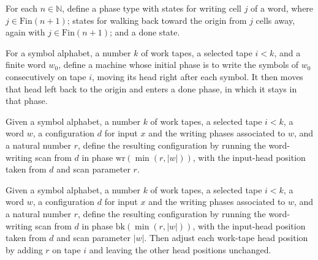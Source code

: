 \begin{definition}
\label{Turing.WritePhase}
\leanok
For each $n\in\mathbb N$, define a phase type with states for writing cell $j$ of a
word, where $j\in\mathrm{Fin}(n+1)$; states for walking back toward the origin from $j$
cells away, again with $j\in\mathrm{Fin}(n+1)$; and a done state.
\end{definition}

\begin{definition}
\label{Turing.writeConstTM}
\leanok
{}
For a symbol alphabet, a number $k$ of work tapes, a selected tape $i<k$, and a finite
word $w_0$, define a machine whose initial phase is to write the symbols of $w_0$
consecutively on tape $i$, moving its head right after each symbol. It then moves that
head left back to the origin and enters a done phase, in which it stays in that phase.
\end{definition}

\begin{definition}
\label{Turing.scanConstF}
\leanok
{}
Given a symbol alphabet, a number $k$ of work tapes, a selected tape $i<k$, a word $w$,
a configuration $d$ for input $x$ and the writing phases associated to $w$, and a
natural number $r$, define the resulting configuration by running the word-writing scan
from $d$ in phase $\mathrm{wr}(\min(r,|w|))$, with the input-head position taken from
$d$ and scan parameter $r$.
\end{definition}

\begin{definition}
\label{Turing.scanConstR}
\leanok
{}
Given a symbol alphabet, a number $k$ of work tapes, a selected tape $i<k$, a word $w$,
a configuration $d$ for input $x$ and the writing phases associated to $w$, and a
natural number $r$, define the resulting configuration by running the word-writing scan
from $d$ in phase $\mathrm{bk}(\min(r,|w|))$, with the input-head position taken from
$d$ and scan parameter $|w|$. Then adjust each work-tape head position by adding $r$ on
tape $i$ and leaving the other head positions unchanged.
\end{definition}

